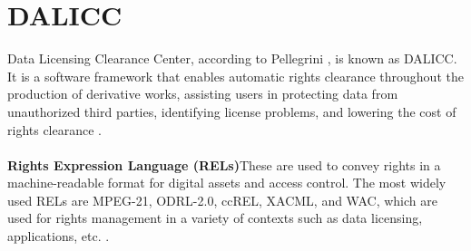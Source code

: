 \chapter{DALICC}
Data Licensing Clearance Center, according to Pellegrini \cite{Tassilo}, is known as DALICC. It is a software framework that enables automatic rights clearance throughout the production of derivative works, assisting users in protecting data from unauthorized third parties, identifying license problems, and lowering the cost of rights clearance \cite{Tassilo}. \\
\\
\textbf{Rights Expression Language (RELs)}These are used to convey rights in a machine-readable format for digital assets and access control. The most widely used RELs are MPEG-21, ODRL-2.0, ccREL, XACML, and WAC, which are used for rights management in a variety of contexts such as data licensing, applications, etc. \cite{Anna}.\\
\\
